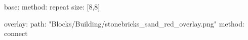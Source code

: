 base:
  method: repeat
  size: [8,8]

overlay:
  path: "Blocks/Building/stonebricks_sand_red_overlay.png"
  method: connect
